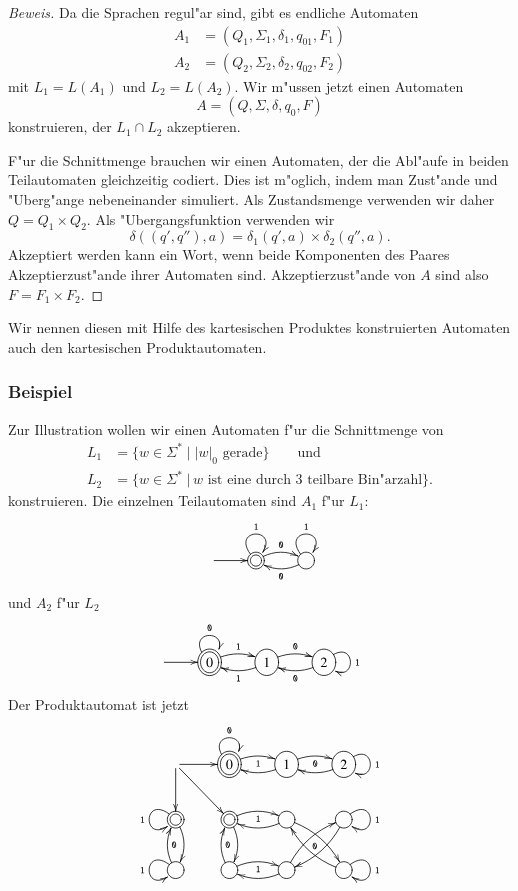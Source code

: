 \begin{proof}[Beweis]
Da die Sprachen regul"ar sind, gibt es endliche Automaten 
\begin{align*}
A_1&=(Q_1,\Sigma_1,\delta_1, q_{01}, F_1)\\
A_2&=(Q_2,\Sigma_2,\delta_2, q_{02}, F_2)
\end{align*}
mit $L_1=L(A_1)$ und $L_2=L(A_2)$. Wir m"ussen
jetzt einen Automaten
\[
A = (Q, \Sigma, \delta, q_0, F)
\]
konstruieren, der $L_1\cap L_2$ akzeptieren.

F"ur die Schnittmenge brauchen wir einen Automaten, der die Abl"aufe 
in beiden Teilautomaten gleichzeitig codiert.
Dies ist m"oglich, indem man Zust"ande und "Uberg"ange nebeneinander
simuliert.
Als Zustandsmenge verwenden wir daher $Q=Q_1\times Q_2$. Als "Ubergangsfunktion
verwenden wir
\[
\delta((q',q''),a)=\delta_1(q',a)\times \delta_2(q'',a).
\]
Akzeptiert werden kann ein Wort, wenn beide Komponenten des Paares 
Akzeptierzust"ande ihrer Automaten sind.
Akzeptierzust"ande von $A$ sind also $F=F_1\times F_2$.
\end{proof}

Wir nennen diesen mit Hilfe des kartesischen Produktes konstruierten
Automaten auch den kartesischen Produktautomaten.

\subsubsection{Beispiel}
Zur Illustration wollen 
wir einen Automaten f"ur die Schnittmenge von
\begin{align*}
L_1&=\{w\in\Sigma^*\;|\; \text{$|w|_0$ gerade}\}\qquad\text{und}\\
L_2&=\{w\in\Sigma^*\;|\,\text{$w$ ist eine durch 3 teilbare Bin"arzahl}\}.
\end{align*}
konstruieren. Die einzelnen Teilautomaten sind $A_1$ f"ur $L_1$:
\[
\entrymodifiers={++[o][F]}
\xymatrix{
*+\txt{}\ar[r]
	&*++[o][F=]{} \ar@/^/[r]^{\tt 0} \ar@(ul,ur)^{\tt 1}
		&{} \ar@/^/[l]^{\tt 0} \ar@(ul,ur)^{\tt 1}
}
\]
und $A_2$ f"ur $L_2$
\[
\entrymodifiers={++[o][F]}
\xymatrix{
*+\txt{}\ar[r]
	&*++[o][F=]{0} \ar@/^/[r]^{\tt 1} \ar@(ul,ur)^{\tt 0}
		&{1} \ar@/^/[l]^{\tt 1} \ar@/^/[r]^{\tt 0}
			&{2}\ar@(ur,dr)^{\tt 1} \ar@/^/[l]^{\tt 0}
}
\]
Der Produktautomat ist jetzt
\[
\entrymodifiers={++[o][F]}
\xymatrix{
*+\txt{} \ar[r] \ar[d] \ar[dr]
	&*++[o][F=]{0} \ar@/^/[r]_{\tt 1} \ar@(ul,ur)^{\tt 0}
		&{1} \ar@/^/[l] \ar@/^/[r]_{\tt 0}
			&{2}\ar@(ur,dr)^{\tt 1} \ar@/^/[l]
\\
*++[o][F=]{} \ar@/^/[d] \ar@(ul,dl)_{\tt 1}
	&*++[o][F=]{} \ar@/^/[d]{\tt 0} \ar@/^/[r]_{\tt 1}
		&{} \ar@/^/[l] \ar@/^/[dr]_{\tt 0}
			&{}\ar@(ur,dr)^{\tt 1} \ar@/^/[dl]
\\
{} \ar@/^/[u]_{\tt 0} \ar@(ul,dl)_{\tt 1}
	&{} \ar@/^/[u]_{\tt 0} \ar@/^/[r]_{\tt 1}
		&{} \ar@/^/[l] \ar@/^/[ur]
			&{}\ar@(ur,dr)^{\tt 1} \ar@/^/[ul]
}
\]

